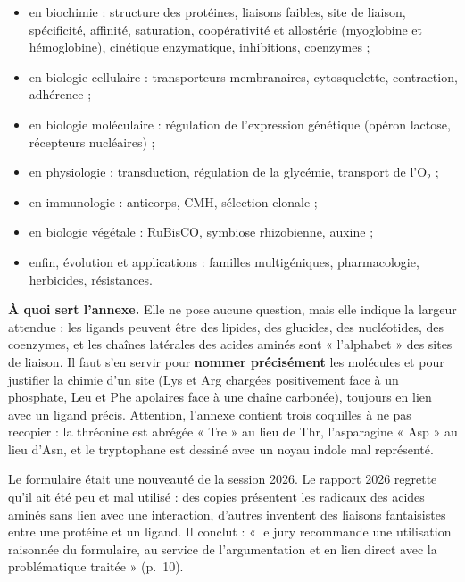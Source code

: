 \documentclass[11pt,a4paper]{article}
\providecommand{\tightlist}{\setlength{\itemsep}{0pt}\setlength{\parskip}{0pt}}
\begin{document}
\begin{itemize}
\tightlist
\item
  en biochimie : structure des protéines, liaisons faibles, site de liaison, spécificité, affinité, saturation, coopérativité et allostérie (myoglobine et hémoglobine), cinétique enzymatique, inhibitions, coenzymes ;
\item
  en biologie cellulaire : transporteurs membranaires, cytosquelette, contraction, adhérence ;
\item
  en biologie moléculaire : régulation de l'expression génétique (opéron lactose, récepteurs nucléaires) ;
\item
  en physiologie : transduction, régulation de la glycémie, transport de l'O₂ ;
\item
  en immunologie : anticorps, CMH, sélection clonale ;
\item
  en biologie végétale : RuBisCO, symbiose rhizobienne, auxine ;
\item
  enfin, évolution et applications : familles multigéniques, pharmacologie, herbicides, résistances.
\end{itemize}

\textbf{À quoi sert l'annexe.} Elle ne pose aucune question, mais elle indique la largeur attendue : les ligands peuvent être des lipides, des glucides, des nucléotides, des coenzymes, et les chaînes latérales des acides aminés sont « l'alphabet » des sites de liaison. Il faut s'en servir pour \textbf{nommer précisément} les molécules et pour justifier la chimie d'un site (Lys et Arg chargées positivement face à un phosphate, Leu et Phe apolaires face à une chaîne carbonée), toujours en lien avec un ligand précis. Attention, l'annexe contient trois coquilles à ne pas recopier : la thréonine est abrégée « Tre » au lieu de Thr, l'asparagine « Asp » au lieu d'Asn, et le tryptophane est dessiné avec un noyau indole mal représenté.

\begin{jury}

Le formulaire était une nouveauté de la session 2026. Le rapport 2026 regrette qu'il ait été peu et mal utilisé : des copies présentent les radicaux des acides aminés sans lien avec une interaction, d'autres inventent des liaisons fantaisistes entre une protéine et un ligand. Il conclut : « le jury recommande une utilisation raisonnée du formulaire, au service de l'argumentation et en lien direct avec la problématique traitée » (p.~10).

\end{jury}
\end{document}
